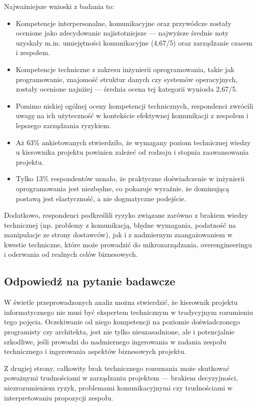 Najważniejsze wnioski z badania to:
\begin{itemize}
  \item Kompetencje interpersonalne, komunikacyjne oraz przywódcze zostały ocenione jako zdecydowanie najistotniejsze — najwyższe średnie noty uzyskały m.in. umiejętności komunikacyjne (4{,}67/5) oraz zarządzanie czasem i zespołem.
  \item Kompetencje techniczne z zakresu inżynierii oprogramowania, takie jak programowanie, znajomość struktur danych czy systemów operacyjnych, zostały ocenione najniżej — średnia ocena tej kategorii wyniosła 2{,}67/5.
  \item Pomimo niskiej ogólnej oceny kompetencji technicznych, respondenci zwrócili uwagę na ich użyteczność w kontekście efektywnej komunikacji z zespołem i lepszego zarządzania ryzykiem.
  \item Aż 63\% ankietowanych stwierdziło, że wymagany poziom technicznej wiedzy u kierownika projektu powinien zależeć od rodzaju i stopnia zaawansowania projektu.
  \item Tylko 13\% respondentów uznało, że praktyczne doświadczenie w inżynierii oprogramowania jest niezbędne, co pokazuje wyraźnie, że dominującą postawą jest elastyczność, a nie dogmatyczne podejście.
\end{itemize}

Dodatkowo, respondenci podkreślili ryzyko związane zarówno z brakiem wiedzy technicznej (np. problemy z komunikacją, błędne wymagania, podatność na manipulacje ze strony dostawców), jak i z nadmiernym zaangażowaniem w kwestie techniczne, które może prowadzić do mikrozarządzania, overengineeringu i oderwania od realnych celów biznesowych.

\subsection{Odpowiedź na pytanie badawcze}

W świetle przeprowadzonych analiz można stwierdzić, że kierownik projektu informatycznego nie musi być ekspertem technicznym w tradycyjnym rozumieniu tego pojęcia. Oczekiwanie od niego kompetencji na poziomie doświadczonego programisty czy architekta, jest nie tylko nieuzasadnione, ale i potencjalnie szkodliwe, jeśli prowadzi do nadmiernego ingerowania w zadania zespołu technicznego i ingerowania aspektów biznesowych projektu.

Z drugiej strony, całkowity brak technicznego rozeznania może skutkować poważnymi trudnościami w zarządzaniu projektem — brakiem decyzyjności, niezrozumieniem ryzyk, problemami komunikacyjnymi czy trudnościami w interpretowaniu propozycji zespołu.

